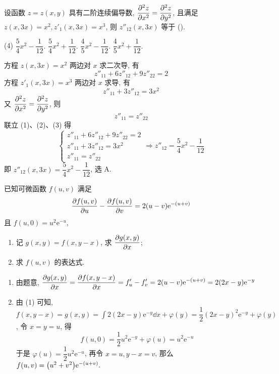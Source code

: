 \begin{example}
    设函数 $z=z(x,y)$ 具有二阶连续偏导数, $\displaystyle \pdv[2]{z}{x}=\pdv[2]{z}{y}$, 且满足 $z(x,3x)=x^2,z'_1(x,3x)=x^3$, 则 $z''_{12}(x,3x)$ 等于 (\quad).
    \begin{tasks}(4)
        \task $\dfrac{5}{4}x^2-\dfrac{1}{12}.$
        \task $\dfrac{5}{4}x^2+\dfrac{1}{12}.$
        \task $\dfrac{4}{5}x^2-\dfrac{1}{12}.$
        \task $\dfrac{4}{5}x^2+\dfrac{1}{12}.$
    \end{tasks}
\end{example}
\begin{solution}
    方程 $z(x,3x)=x^2$ 两边对 $x$ 求二次导, 有 
    \begin{equation*}
        z''_{11}+6z''_{12}+9z''_{22}=2
        \tag{1}
    \end{equation*}
    方程 $z'_1(x,3x)=x^3$ 两边对 $x$ 求导, 有
    \begin{equation*}
        z''_{11}+3z''_{12}=3x^2
        \tag{2}
    \end{equation*}
    又 $\displaystyle \pdv[2]{z}{x}=\pdv[2]{z}{y}$, 则 
    \begin{equation*}
        z''_{11}=z''_{22}
        \tag{3}
    \end{equation*}
    联立 (1)、(2)、(3) 得 
    $$
    \begin{cases}
        z''_{11}+6z''_{12}+9z''_{22}=2 \\
        z''_{11}+3z''_{12}=3x^2\\ 
        z''_{11}=z''_{22}
    \end{cases}\Rightarrow z''_{12}=\dfrac{5}{4}x^2-\dfrac{1}{12}
    $$
    即 $z''_{12}(x,3x)=\dfrac{5}{4}x^2-\dfrac{1}{12}$, 选 A.
\end{solution}

\begin{example}
    已知可微函数 $f(u,v)$ 满足 $$\pdv{f(u,v)}{u}-\pdv{f(u,v)}{v}=2(u-v)\mathrm{e}^{-(u+v)}$$
    且 $f(u,0)=u^2\mathrm{e}^{-u}$,
    \begin{enumerate}[label=(\arabic{*})]
        \item 记 $g(x,y)=f(x,y-x)$, 求 $\displaystyle\pdv{g(x,y)}{x}$;
        \item 求 $f(u,v)$ 的表达式.
    \end{enumerate}
\end{example}
\begin{solution}
    \begin{enumerate}[label=(\arabic{*})]
        \item 由题意, $\displaystyle\pdv{g(x,y)}{x}=\pdv{f(x,y-x)}{x}=f'_u-f'_v=2(u-v)\mathrm{e}^{-(u+v)}=2(2x-y)\mathrm{e}^{-y}$
        \item 由 (1) 可知, $\displaystyle f(x,y-x)=g(x,y)=\int 2(2x-y)\mathrm{e}^{-y}\dd x+\varphi(y)=\dfrac{1}{2}(2x-y)^2\mathrm{e}^{-y}+\varphi(y)$, 令 $x=y=u$, 得
              $$f(u,0)=\dfrac{1}{2}u^2\mathrm{e}^{-y}+\varphi(u)=u^2\mathrm{e}^{-u}$$
              于是 $\varphi(u)=\dfrac{1}{2}u^2\mathrm{e}^{-u}$, 再令 $x=u,y-x=v$, 那么 $f(u,v)=\qty(u^2+v^2)\mathrm{e}^{-(u+v)}.$
    \end{enumerate}
\end{solution}

